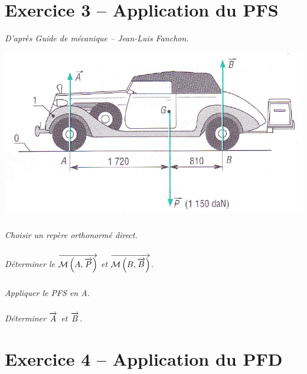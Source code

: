 \documentclass[10pt,fleqn]{book} %
\begin{document}
\begin{multicols}{2}
\section*{Exercice 3 -- Application du PFS}
\setcounter{subparagraph}{0}

\textit{D'après Guide de mécanique -- Jean-Luis Fanchon.}

\begin{center}
\includegraphics[width=\linewidth]{images/fig_05}
\end{center}

\subparagraph{}
\textit{Choisir un repère orthonormé direct.}


\subparagraph{}
\textit{Déterminer le $\overrightarrow{\mathcal{M}\left(A,\overrightarrow{P} \right)}$ et $\overrightarrow{\mathcal{M}\left(B,\overrightarrow{B} \right)}$.}


\subparagraph{}
\textit{Appliquer le PFS en A.}

\subparagraph{}
\textit{Déterminer $\overrightarrow{A}$ et $\overrightarrow{B}$.}

\section*{Exercice 4 -- Application du PFD}
\end{multicols}
\end{document}
